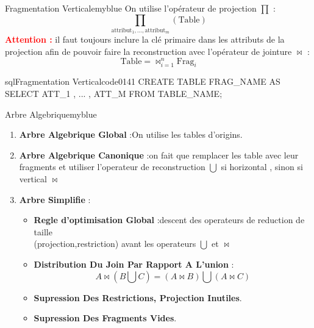 \documentclass{article}
\DeclareMathOperator*{\JoinOp}{\bowtie}
\begin{document}
\newpage

\begin{prettyBox}{Fragmentation Verticale}{myblue}
    On utilise l'opérateur de projection $\prod$ :
    \[
        {\textstyle \prod_{\text{attribut}_1 , \dots , \text{attribut}_m}} (\text{Table})
    \]
    \textcolor{red}{\textbf{\large{Attention :}}} il faut toujours inclure la clé primaire dans les attributs de la projection afin de pouvoir
    faire la reconstruction avec l'opérateur de jointure $\bowtie$ :
    \[
        \text{Table} =  \JoinOp_{i=1}^{n}  \text{Frag}_i
    \]
\end{prettyBox}

\vspace{0.45cm}

\begin{codeInput}{sql}{Fragmentation Vertical}{code01}{41}
CREATE TABLE FRAG_NAME AS 
SELECT ATT_1 , ... , ATT_M FROM TABLE_NAME;
\end{codeInput}

\vspace{1cm}

\begin{prettyBox}{Arbre Algebrique}{myblue}
    \begin{enumerate}
        \item \textbf{Arbre Algebrique Global} :On utilise les tables d'origins.  
        \item \textbf{Arbre Algebrique Canonique} :on fait que remplacer les table avec leur fragments et
            utiliser l'operateur de reconstruction $\bigcup$ si horizontal , sinon si vertical $\JoinOp$
        \item \textbf{Arbre Simplifie} :
            \begin{itemize}
                \item \textbf{Regle d'optimisation Global} :descent des operateurs de reduction de taille\\ 
                    (projection,restriction) avant les operateurs $\bigcup$ et $\JoinOp$
                \item \textbf{Distribution Du Join Par Rapport A L'union} : 
                    \[A \JoinOp (B \bigcup C) = (A\JoinOp B) \bigcup (A \JoinOp C) \]
                \item \textbf{Supression Des Restrictions, Projection Inutiles}.
                \item \textbf{Supression Des Fragments Vides}.
            \end{itemize}
    \end{enumerate}
\end{prettyBox}
\end{document}
